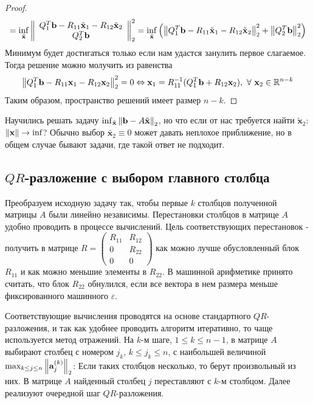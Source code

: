 \begin{proof}
  \[=\inf_{\tilde{\mathbf{x}}}\left\lVert\begin{array}{c} Q_1^T\mathbf{b}- R_{11}\tilde{\mathbf{x}}_1-R_{12}\tilde{\mathbf{x}}_2 \\ Q_2^T\mathbf{b} \end{array}\right\rVert_2^2
    =\inf_{\tilde{\mathbf{x}}}\left(\left\lVert Q_1^T\mathbf{b}- R_{11}\tilde{\mathbf{x}}_1-R_{12}\tilde{\mathbf{x}}_2\right\rVert_2^2 + \left\lVert Q_2^T\mathbf{b}\right\rVert^2_2\right)\]
  Минимум будет достигаться только если нам удастся занулить первое слагаемое.
  Тогда решение можно молучить из равенства
  \[\norm{Q_1^T\mathbf{b}- R_{11}\mathbf{x}_1-R_{12}\mathbf{x}_2}_2^2=0\Leftrightarrow \mathbf{x}_1=R^{-1}_{11}(Q_1^T\mathbf{b}+R_{12}\mathbf{x}_2),\ \forall\ \mathbf{x}_2\in\R^{n-k}\]
  Таким образом, пространство решений имеет размер $n-k$.
\end{proof}
\begin{remark}
  Научились решать задачу $\inf_{\tilde{\mathbf{x}}}\left\lVert\mathbf{b}-A\tilde{\mathbf{x}}\right\rVert_2$,
  но что если от нас требуется найти $\tilde{\mathbf{x}}_2$: $\left\lVert\mathbf{x}\right\rVert\rightarrow\inf$?
  Обычно выбор $\tilde{\mathbf{x}_2}\equiv0$ может давать неплохое приближение, но
  в общем случае бывают задачи, где такой ответ не подходит.
\end{remark}

\subsection*{$QR$-разложение с выбором главного столбца}

Преобразуем исходную задачу так, чтобы первые $k$
столбцов полученной матрицы $A$ были линейно независимы.
Перестановки столбцов в матрице $A$ удобно проводить
в процессе вычислений. Цель соответствующих перестановок - получить в
матрице $R=\left(\begin{array}{cc}
      R_{11} & R_{12} \\
      0      & R_{22} \\
      0      & 0
    \end{array}\right)$ как можно лучше обусловленный блок $R_{11}$ и
как можно меньшие элементы в $R_{22}$. В машинной арифметике
принято считать, что блок $R_{22}$ обнулился, если все вектора в нем
размера меньше фиксированного машинного $\varepsilon$.

Соответствующие вычисления проводятся на основе стандартного $QR$-
разложения, и так как удобнее проводить алгоритм итеративно,
то чаще используется метод отражений.
На $k$-м шаге, $1\leq k \leq n-1$, в матрице $A$ выбирают столбец
с номером $j_k$, $k\leq j_k\leq n$, с наибольшей величиной $\max_{k\leq j\leq n}\left\lVert\mathbf{a}^{(k)}_{j}\right\rVert_2$:
Если таких столбцов несколько, то берут произвольный из них. В матрице
$A$ найденный столбец $j$ переставляют с $k$-м столбцом.
Далее реализуют очередной шаг $QR$-разложения.

